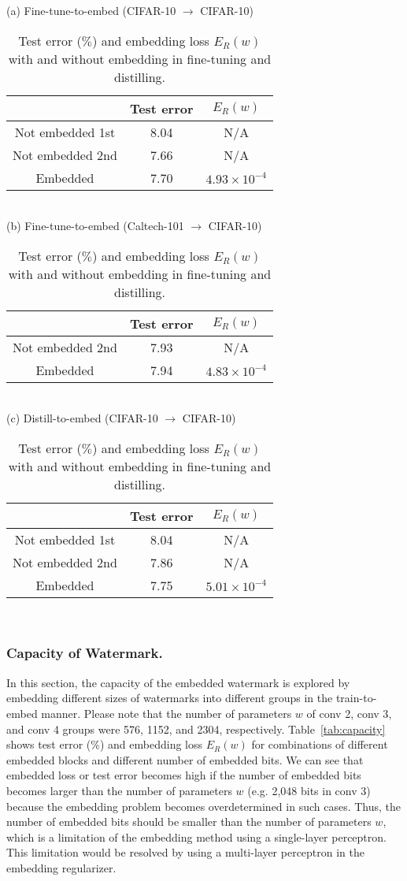 \documentclass[10pt,twocolumn,letterpaper]{article}
\begin{document}
\begin{table}[tb]
	\centering
	\caption{Test error ($\%$) and embedding loss $E_R (w)$ with and without embedding in fine-tuning and distilling.}
	\label{tab:embed_result_finetune}
	(a) Fine-tune-to-embed (CIFAR-10 $\rightarrow$ CIFAR-10) \\
\begin{tabular}{c|cc} \hline
					& Test error	& $E_R (w)$	\\ \hline
Not embedded 1st	& 8.04			& N/A				\\
Not embedded 2nd	& 7.66			& N/A				\\
Embedded			& 7.70			& $4.93{\times}10^{-4}$	\\ \hline
	\end{tabular} \\
	(b) Fine-tune-to-embed (Caltech-101 $\rightarrow$ CIFAR-10) \\
\begin{tabular}{c|cc} \hline
					& Test error	& $E_R (w)$	\\ \hline
Not embedded 2nd		& 7.93			& N/A				\\
Embedded			& 7.94			& $4.83{\times}10^{-4}$	\\ \hline
	\end{tabular} \\
	(c) Distill-to-embed (CIFAR-10 $\rightarrow$ CIFAR-10)	\\
\begin{tabular}{c|cc} \hline
				& Test error	& $E_R (w)$	\\ \hline
Not embedded 1st	& 8.04				& N/A				\\
Not embedded 2nd	& 7.86				& N/A				\\
Embedded			& 7.75			& $5.01{\times}10^{-4}$	\\ \hline
	\end{tabular} \\
\end{table}

\subsubsection{Capacity of Watermark.}
In this section, the capacity of the embedded watermark is explored by embedding different sizes of watermarks into different groups in the train-to-embed manner.
Please note that the number of parameters $w$ of \textsf{conv 2}, \textsf{conv 3}, and \textsf{conv 4} groups were 576, 1152,  and 2304, respectively.
Table~\ref{tab:capacity} shows test error ($\%$) and embedding loss $E_R (w)$ for combinations of different embedded blocks and different number of embedded bits.
We can see that embedded loss or test error becomes high if the number of embedded bits becomes larger than the number of parameters $w$ (e.g. 2,048 bits in \textsf{conv 3}) because the embedding problem becomes overdetermined in such cases.
Thus, the number of embedded bits should be smaller than the number of parameters $w$, which is a limitation of the embedding method using a single-layer perceptron.
This limitation would be resolved by using a multi-layer perceptron in the embedding regularizer.
\end{document}
